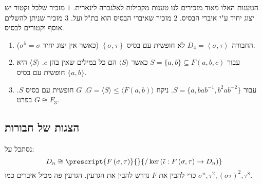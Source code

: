\documentclass{tstextbook}
\begin{document}
\begin{remark}
הטענות האלו מאוד מזכירים לנו טענות מקבילות לאלגברה לינארית. \(1\) מזכיר שלכל וקטור יש יצוג יחיד ע"י איברי הבסיס. \(2\) מזכיר שאיברי הבסיס הוא בת"ל ועל. \(3\) מזכיר שניתן להשלים אוסף וקטורים לבסיס.

\end{remark}
\begin{example}
  \begin{enumerate}
    \item החבורה \(D_{4}=\left\langle  \sigma,\tau  \right\rangle\) לא חופשית עם בסיס \(\left\{  \sigma,\tau  \right\}\) (כאשר אין יצוג יחיד \(\sigma^5=\sigma\)). 


    \item עבור \(S=\{ a,b \}\subseteq F(a,b,c)\) כאשר \(\langle S\rangle\) הם כל במילים שאין בהן \(c\). \(\langle S\rangle\) היא חופשית עם בסיס \(\{ a,b \}\). 


    \item עבור \(S=\{ a,bab^{-1} ,b^2ab^{-2} \}\). ניקח \(G=\langle S\rangle \leq\langle F(a,b)\rangle\). \(G\) חופשית עם בסיס \(S\). בפרט \(G\cong F_{3}\). 


  \end{enumerate}
\end{example}
\subsection{הצגות של חבורות}

נסתכל על:
$$D_{n}\cong \prescript{F\left( \sigma,\tau \right)}{}{/\ker\left( \tilde{\iota}:F\left( \sigma,\tau \right)\to D_{n} \right) }$$
כדי להבין את \(F\) נדרש להבין את הגרעין. הגרעין פה מכיל איברים כמו \(\sigma^n,\tau^2,\left( \sigma \tau \right)^2,\tau^8\).
\end{document}
